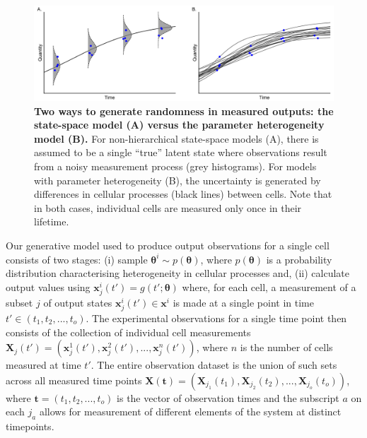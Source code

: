 \documentclass[10pt,letterpaper]{article}
\begin{document}
\begin{figure}[H]
	\centerline{\includegraphics[width=\textwidth]{../figures/data_generation.pdf}}
	\caption{\textbf{Two ways to generate randomness in measured outputs: the state-space model (A) versus the parameter heterogeneity model (B).} For non-hierarchical state-space models (A), there is assumed to be a single ``true'' latent state where observations result from a noisy measurement process (grey histograms). For models with parameter heterogeneity (B), the uncertainty is generated by differences in cellular processes (black lines) between cells. Note that in both cases, individual cells are measured only once in their lifetime.}
	\label{fig:data_generation}
\end{figure}

Our generative model used to produce output observations for a single cell consists of two stages: (i) sample $\boldsymbol{\theta}^i\sim p(\boldsymbol{\theta})$, where $p(\boldsymbol{\theta})$ is a probability distribution characterising heterogeneity in cellular processes and, (ii) calculate output values using $\boldsymbol{x}_j^i(t') = g(t'; \boldsymbol{\theta})$ where, for each cell, a measurement of a subset $j$ of output states $\boldsymbol{x}_j^i(t')\in\boldsymbol{x}^i$ is made at a single point in time $t'\in (t_1, t_2, ..., t_o)$. The experimental observations for a single time point then consists of the collection of individual cell measurements $\boldsymbol{X}_j(t') = (\boldsymbol{x}_j^1(t'), \boldsymbol{x}_j^2(t'), ..., \boldsymbol{x}_j^n(t'))$, where $n$ is the number of cells measured at time $t'$. The entire observation dataset is the union of such sets across all measured time points $\boldsymbol{X}(\boldsymbol{t}) = (\boldsymbol{X}_{j_1}(t_1), \boldsymbol{X}_{j_2}(t_2), ..., \boldsymbol{X}_{j_o}(t_o))$, where $\boldsymbol{t}=(t_1, t_2, ..., t_o)$ is the vector of observation times and the subscript $a$ on each $j_a$ allows for measurement of different elements of the system at distinct timepoints.
\end{document}
